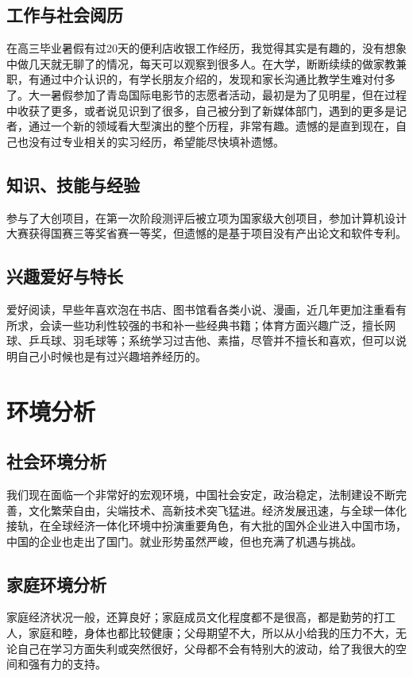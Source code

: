 \documentclass{article}
\begin{document}
\subsection{工作与社会阅历}
在高三毕业暑假有过20天的便利店收银工作经历，我觉得其实是有趣的，没有想象中做几天就无聊了的情况，每天可以观察到很多人。在大学，断断续续的做家教兼职，有通过中介认识的，有学长朋友介绍的，发现和家长沟通比教学生难对付多了。大一暑假参加了青岛国际电影节的志愿者活动，最初是为了见明星，但在过程中收获了更多，或者说见识到了很多，自己被分到了新媒体部门，遇到的更多是记者，通过一个新的领域看大型演出的整个历程，非常有趣。遗憾的是直到现在，自己也没有过专业相关的实习经历，希望能尽快填补遗憾。\par
\subsection{知识、技能与经验}
参与了大创项目，在第一次阶段测评后被立项为国家级大创项目，参加计算机设计大赛获得国赛三等奖省赛一等奖，但遗憾的是基于项目没有产出论文和软件专利。\par
\subsection{兴趣爱好与特长}
爱好阅读，早些年喜欢泡在书店、图书馆看各类小说、漫画，近几年更加注重看有所求，会读一些功利性较强的书和补一些经典书籍；体育方面兴趣广泛，擅长网球、乒乓球、羽毛球等；系统学习过吉他、素描，尽管并不擅长和喜欢，但可以说明自己小时候也是有过兴趣培养经历的。\par
\section{环境分析}
\par
\par
\subsection{社会环境分析}
我们现在面临一个非常好的宏观环境，中国社会安定，政治稳定，法制建设不断完善，文化繁荣自由，尖端技术、高新技术突飞猛进。经济发展迅速，与全球一体化接轨，在全球经济一体化环境中扮演重要角色，有大批的国外企业进入中国市场，中国的企业也走出了国门。就业形势虽然严峻，但也充满了机遇与挑战。\par
\subsection{家庭环境分析}
家庭经济状况一般，还算良好；家庭成员文化程度都不是很高，都是勤劳的打工人，家庭和睦，身体也都比较健康；父母期望不大，所以从小给我的压力不大，无论自己在学习方面失利或突然很好，父母都不会有特别大的波动，给了我很大的空间和强有力的支持。\par
\end{document}

